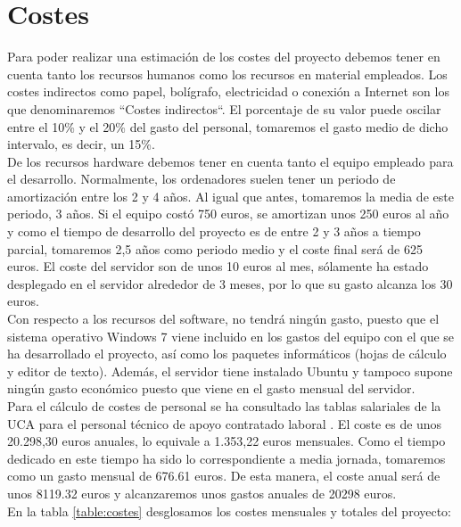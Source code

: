 \section{Costes}
Para poder realizar una estimación de los costes del proyecto debemos tener en cuenta tanto los recursos humanos como los recursos en material empleados. Los costes indirectos como papel, bolígrafo, electricidad o conexión a Internet son los que denominaremos ``Costes indirectos``. El porcentaje de su valor puede oscilar entre el 10\% y el 20\% del gasto del personal, tomaremos el gasto medio de dicho intervalo, es decir, un 15\%.\\

De los recursos hardware debemos tener en cuenta tanto el equipo empleado para el desarrollo. Normalmente, los ordenadores suelen tener un periodo de amortización entre los 2 y 4 años. Al igual que antes, tomaremos la media de este periodo, 3 años. Si el equipo costó 750 euros, se amortizan unos 250 euros al año y como el tiempo de desarrollo del proyecto es de entre 2 y 3 años a tiempo parcial, tomaremos 2,5 años como periodo medio y el coste final será de 625 euros. El coste del servidor son de unos 10 euros al mes, sólamente ha estado desplegado en el servidor alrededor de 3 meses, por lo que su gasto alcanza los 30 euros.\\

Con respecto a los recursos del software, no tendrá ningún gasto, puesto que el sistema operativo Windows 7 viene incluido en los gastos del equipo con el que se ha desarrollado el proyecto, así como los paquetes informáticos (hojas de cálculo y editor de texto). Además, el servidor tiene instalado Ubuntu y tampoco supone ningún gasto económico puesto que viene en el gasto mensual del servidor.\\

Para el cálculo de costes de personal se ha consultado las tablas salariales de la UCA para el personal técnico de apoyo contratado laboral \cite{paslaboral}. El coste es de unos 20.298,30 euros anuales, lo equivale a 1.353,22 euros mensuales. Como el tiempo dedicado en este tiempo ha sido lo correspondiente a media jornada, tomaremos como un gasto mensual de 676.61 euros. De esta manera, el coste anual será de unos 8119.32 euros y alcanzaremos unos gastos anuales de 20298 euros.\\

En la tabla \ref{table:costes} desglosamos los costes mensuales y totales del proyecto:

